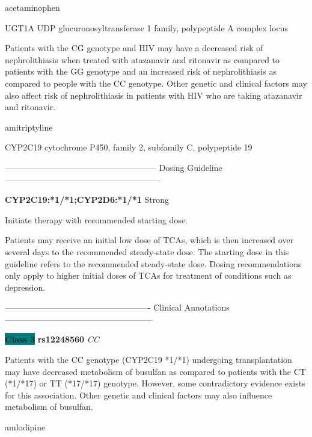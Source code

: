 \documentclass{resume} %
\begin{document}
\begin{rSection}{ acetaminophen }
\begin{rSubsection}{ UGT1A }{ UDP glucuronosyltransferase 1 family, polypeptide A complex locus }{}{}
\item[] Patients with the CG genotype and HIV may have a decreased risk of nephrolithiasis when treated with atazanavir and ritonavir as compared to patients with the GG genotype and an increased risk of nephrolithiasis as compared to people with the CC genotype. Other genetic and clinical factors may also affect risk of nephrolithiasis in patients with HIV who are taking atazanavir and ritonavir.
\end{rSubsection}

\end{rSection}\begin{rSection}{ amitriptyline }
\item[]

\begin{rSubsection}{ CYP2C19 }{ cytochrome P450, family 2, subfamily C, polypeptide 19 }{}{}
\item[]
\item[] ------------------------------------------------------ Dosing Guideline --------------------------------------------------------\newline
\item[] \textbf{ CYP2C19:*1/*1;CYP2D6:*1/*1 } Strong

\item[] Initiate therapy with recommended starting dose.

Patients may receive an initial low dose of TCAs, which is then increased over several days to the recommended steady-state dose. The starting dose in this guideline refers to the recommended steady-state dose. Dosing recommendations only apply to higher initial doses of TCAs for treatment of conditions such as depression.
\item[] ---------------------------------------------------- Clinical Annotations -----------------------------------------------------\newline
\item \textbf{\colorbox{teal} {Class 3}} \textbf{ rs12248560 } \textit{ CC }
\item[] Patients with the CC genotype (CYP2C19 *1/*1) undergoing transplantation may have decreased metabolism of busulfan as compared to patients with the CT (*1/*17) or TT (*17/*17) genotype. However, some contradictory evidence exists for this association. Other genetic and clinical factors may also influence metabolism of busulfan.
\end{rSubsection}

\end{rSection}\begin{rSection}{ amlodipine }
\item[]


\end{rSection}
\end{document}
